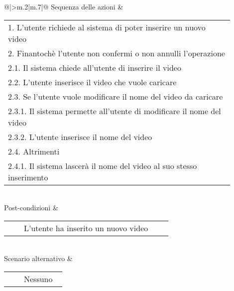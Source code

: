 \begin{table}[H]
\begin{longtable}{@{}|>{\centering\arraybackslash}m{.2\textwidth}|m{.7\textwidth}|@{}}
		Sequenza delle azioni & \begin{tabular}{m{0.9\linewidth}}\hspace{0.0cm}1. L'utente richiede al sistema di poter inserire un nuovo video\\\hspace{0.0cm}2. Finantochè l'utente non confermi o non annulli l'operazione\\\hspace{0.5cm}\hspace{0.0cm}2.1. Il sistema chiede all'utente di inserire il video\\\hspace{0.5cm}\hspace{0.0cm}2.2. L'utente inserisce il video che vuole caricare\\\hspace{0.5cm}\hspace{0.0cm}2.3. Se l'utente vuole modificare il nome del video da caricare\\\hspace{1.0cm}\hspace{0.5cm}\hspace{0.0cm}2.3.1. Il sistema permette all'utente di modificare il nome del video\\\hspace{1.0cm}\hspace{0.5cm}\hspace{0.0cm}2.3.2. L'utente inserisce il nome del video\\\hspace{0.5cm}\hspace{0.0cm}2.4. Altrimenti\\\hspace{1.0cm}\hspace{0.5cm}\hspace{0.0cm}2.4.1. Il sistema lascerà il nome del video al suo stesso inserimento\\\end{tabular}\\
		Post-condizioni & \begin{tabular}{m{0.9\linewidth}}~~\llap{\textbullet}~~L'utente ha inserito un nuovo video\\\end{tabular}\\
		Scenario alternativo & \begin{tabular}{m{0.9\linewidth}}~~\llap{\textbullet}~~Nessuno\\\end{tabular}\\\hline
		
	\end{longtable}
\end{table}

